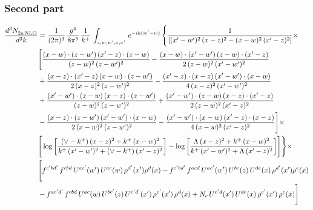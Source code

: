 \documentclass[9pt]{article}
\numberwithin{equation}{section}
\begin{document}
\subsubsection{Second part}

\begin{align} 
    \frac{d^{3}N_{2a\,\rm NLO}^{\rm}}{d^{3}k}  & = \frac{1}{(2\pi)^{3}}\, \frac{g^{4}}{8\pi^{5}}\,\frac{1}{k^{+}}\,\int_{z,w,w^{\prime},x,x'}\, e^{-ik(w^{\prime}-w)}\, \Bigg\{\frac{1}{\left[(x'-w')^{2}\, (x-z)^{2}-(x-w)^{2}\, (x'-z)^{2}\right]}\times\,\notag \\ & \Bigg[\frac{(x-w)\cdot (z-w')\, (x'-z)\cdot (z-w)}{(z-w)^{2}\,(z-w')^{2}}-\frac{(x-w)\cdot (x'-w')\, (z-w)\cdot (x'-z)}{2\, (z-w)^{2}\, (x'-w')^{2}}\notag \\ & + \frac{(x-z)\cdot (x'-z)\, (x-w)\cdot (z-w')}{2\, (x-z)^{2}\, (z-w')^{2}}-\frac{(x'-z)\cdot (x-z)\, (x'-w')\cdot (x-w)}{4\, (x-z)^{2}\, (x'-w')^{2}}\notag \\ & + \frac{(x'-w')\cdot (z-w)\, (x-z)\cdot (z-w')}{(z-w)^{2}\,(z-w')^{2}}+\frac{(x'-w')\cdot (z-w)\, (x-z)\cdot (x'-z)}{2\, (z-w)^{2}\, (x'-z)^{2}}\notag \\ & - \frac{(x-z)\cdot (z-w')\, (x'-w')\cdot (x-w)}{2\, (x-w)^{2}\, (z-w')^{2}} -\frac{(x'-w')\cdot (x-w)\, (x'-z)\cdot (x-z)}{4\, (x-w)^{2}\, (x'-z)^{2}}\Bigg]\times\notag \\ &  \Bigg[\log{\left[\frac{(\vee-k^{+})\,(x-z)^{2}+k^{+}\,(x-w)^{2}}{k^{+}\, (x'-w')^{2} + (\vee-k^{+})\, (x'-z)^{2}}\right]}-\log{\left[\frac{\Lambda\,(x-z)^{2}+k^{+}\,(x-w)^{2}}{k^{+}\, (x'-w')^{2} + \Lambda\, (x'-z)^{2}}\right]}\Bigg] \Bigg\} \times\, \notag \\ & \Bigg[f^{c'bd'}\,f^{cbd}\, U^{ac'}(w')\,U^{ac}(w)\,\rho^{d'}(x')\rho^{d}(x)- f^{c'bd'}\,f^{acd}\,U^{ac'}(w')\,U^{bc}(z)\,U^{de}(x)\,\rho^{d'}(x')\rho^{e}(x) \notag \\ & -f^{ac'd'}\,f^{cbd}\,U^{ac}(w)\,U^{bc'}(z)\,U^{e'd'}(x')\,\rho^{e'}(x')\,\rho^{d}(x) +N_{c}\,U^{e'd}(x')\,U^{de}(x)\,\rho^{e'}(x')\,\rho^{e}(x)\Bigg]
\end{align}
\end{document}
